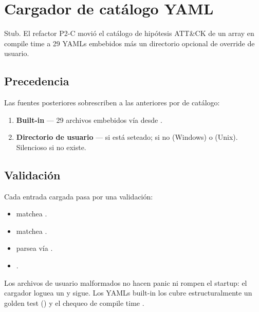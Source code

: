 \chapter{Cargador de catálogo YAML}
\label{ch:catalog-yaml}

\begin{note}
Stub. El refactor P2-C movió el catálogo de hipótesis ATT\&CK de
un array  en compile time a 29 YAMLs embebidos más un
directorio opcional de override de usuario.
\end{note}

\section{Precedencia}

Las fuentes posteriores sobrescriben a las anteriores por
 de catálogo:
\begin{enumerate}
    \item \textbf{Built-in} --- 29 archivos embebidos vía
         desde
        .
    \item \textbf{Directorio de usuario} ---
         si está seteado; si no
         (Windows) o
         (Unix). Silencioso si
        no existe.
\end{enumerate}

\section{Validación}

Cada entrada cargada pasa por una validación:

\begin{itemize}
    \item {} matchea \code{[A-Za-z0-9\-\_]+}.
    \item {} matchea
        .
    \item {} parsea vía .
    \item {}.
\end{itemize}

Los archivos de usuario malformados no hacen panic ni rompen el
startup: el cargador loguea un  y sigue.
Los YAMLs built-in los cubre estructuralmente un golden test
() y el
chequeo de compile time .

